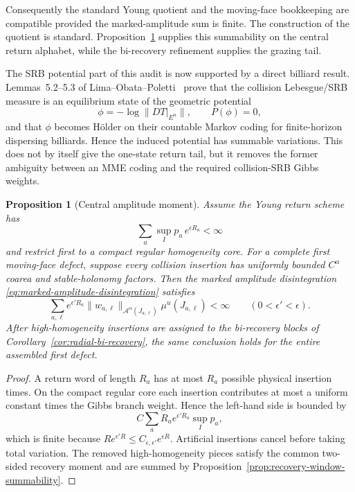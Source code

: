 \documentclass[11pt]{article}
\newtheorem{proposition}[theorem]{Proposition}
\begin{document}
Consequently the standard Young quotient and the moving-face bookkeeping are
compatible provided the marked-amplitude sum is finite.  The construction of
the quotient is standard.  Proposition~\ref{prop:central-marked-moment}
supplies this summability on the central return alphabet, while the
bi-recovery refinement supplies the grazing tail.

The SRB potential part of this audit is now supported by a direct billiard
result.  Lemmas~5.2--5.3 of Lima--Obata--Poletti~\cite{LOP} prove that the
collision Lebesgue/SRB measure is an equilibrium state of the geometric
potential
\[
 \phi=-\log\|DT|_{E^u}\|,
 \qquad P(\phi)=0,
\]
and that $\phi$ becomes H\"older on their countable Markov coding for
finite-horizon dispersing billiards.  Hence the induced potential has
summable variations.  This does not by itself give the one-state return tail,
but it removes the former ambiguity between an MME coding and the required
collision-SRB Gibbs weights.

\begin{proposition}[Central amplitude moment]
\label{prop:central-marked-moment}
Assume the Young return scheme has
\[
 \sum_a\sup_I p_a\,e^{\epsilon R_a}<\infty
\]
and restrict first to a compact regular homogeneity core.  For a complete
first moving-face defect, suppose every collision insertion has uniformly
bounded $C^\alpha$ coarea and stable-holonomy factors.  Then the marked
amplitude disintegration \eqref{eq:marked-amplitude-disintegration} satisfies
\[
 \sum_{a,\ell}e^{\epsilon'R_a}
   \|w_{a,\ell}\|_{\mathcal A^\alpha(J_{a,\ell})}
   \mu^u(J_{a,\ell})<\infty
 \qquad(0<\epsilon'<\epsilon).
\]
After high-homogeneity insertions are assigned to the bi-recovery blocks of
Corollary~\ref{cor:radial-bi-recovery}, the same conclusion holds for the
entire assembled first defect.
\end{proposition}

\begin{proof}
A return word of length $R_a$ has at most $R_a$ possible physical insertion
times.  On the compact regular core each insertion contributes at most a
uniform constant times the Gibbs branch weight.  Hence the left-hand side is
bounded by
\[
 C\sum_a R_a e^{\epsilon'R_a}\sup_I p_a,
\]
which is finite because
$R e^{\epsilon'R}\le C_{\epsilon,\epsilon'}e^{\epsilon R}$.
Artificial insertions cancel before taking total variation.  The removed
high-homogeneity pieces satisfy the common two-sided recovery moment and are
summed by Proposition~\ref{prop:recovery-window-summability}.
\end{proof}
\end{document}
